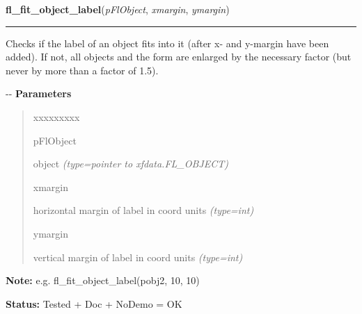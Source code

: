 \hspace{.8\funcindent}\begin{boxedminipage}{\funcwidth}

    \raggedright \textbf{fl\_fit\_object\_label}(\textit{pFlObject}, \textit{xmargin}, \textit{ymargin})

    \vspace{-1.5ex}

    \rule{\textwidth}{0.5\fboxrule}
\setlength{\parskip}{2ex}

Checks if the label of an object fits into it (after x- and y-margin
have been added). If not, all objects and the form are enlarged by the
necessary factor (but never by more than a factor of 1.5).

-{}-
\setlength{\parskip}{1ex}
      \textbf{Parameters}
      \vspace{-1ex}

      \begin{quote}
        \begin{Ventry}{xxxxxxxxx}

          \item[pFlObject]


object
            {\it (type=pointer to xfdata.FL\_OBJECT)}

          \item[xmargin]


horizontal margin of label in coord units
            {\it (type=int)}

          \item[ymargin]


vertical margin of label in coord units
            {\it (type=int)}

        \end{Ventry}

      \end{quote}

\textbf{Note:} 
e.g. fl\_fit\_object\_label(pobj2, 10, 10)


\textbf{Status:} 
Tested + Doc + NoDemo = OK


    \end{boxedminipage}

    \label{xformslib:flbasic:fl_get_object_geometry}

    \vspace{0.5ex}

